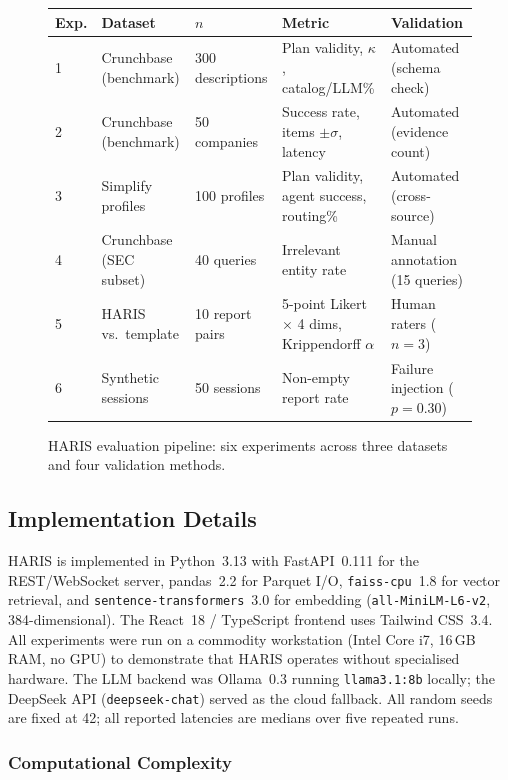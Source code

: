\documentclass[preprint,12pt]{elsarticle}
\begin{document}
\begin{figure}[!t]
\small\centering
\caption{HARIS evaluation pipeline: six experiments across three datasets and
  four validation methods.}
\label{fig:eval_pipeline}
\begin{tabular}{p{0.5cm} p{2.8cm} p{3.0cm} p{3.4cm} p{3.8cm}}
\toprule
\textbf{Exp.} & \textbf{Dataset} & \textbf{$n$} & \textbf{Metric} & \textbf{Validation} \\
\midrule
1 & Crunchbase (benchmark)  & 300 descriptions & Plan validity, $\kappa$, catalog/LLM\% & Automated (schema check) \\
2 & Crunchbase (benchmark)  & 50 companies     & Success rate, items $\pm\sigma$, latency & Automated (evidence count) \\
3 & Simplify profiles       & 100 profiles     & Plan validity, agent success, routing\% & Automated (cross-source) \\
4 & Crunchbase (SEC subset) & 40 queries       & Irrelevant entity rate & Manual annotation (15 queries) \\
5 & HARIS vs.\ template     & 10 report pairs  & 5-point Likert $\times$ 4 dims, Krippendorff $\alpha$ & Human raters ($n{=}3$) \\
6 & Synthetic sessions      & 50 sessions      & Non-empty report rate & Failure injection ($p{=}0.30$) \\
\bottomrule
\end{tabular}
\end{figure}

\subsection{Implementation Details}
\label{sec:method_impl}

HARIS is implemented in Python~3.13 with FastAPI~0.111 for the REST/WebSocket
server, pandas~2.2 for Parquet I/O, \texttt{faiss-cpu}~1.8 for vector retrieval,
and \texttt{sentence-transformers}~3.0 for embedding (\texttt{all-MiniLM-L6-v2},
384-dimensional). The React~18 / TypeScript frontend uses Tailwind CSS~3.4.
All experiments were run on a commodity workstation (Intel Core i7, 16\,GB RAM,
no GPU) to demonstrate that HARIS operates without specialised hardware. The
LLM backend was Ollama~0.3 running \texttt{llama3.1:8b} locally; the DeepSeek
API (\texttt{deepseek-chat}) served as the cloud fallback. All random seeds are
fixed at 42; all reported latencies are medians over five repeated runs.

\subsubsection{Computational Complexity}
\label{sec:complexity}
\end{document}
